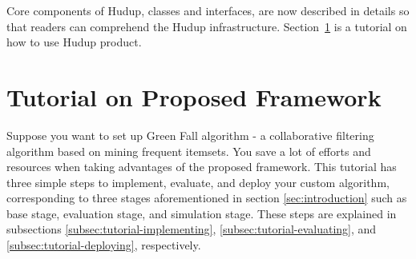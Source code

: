 \documentclass[a4paper]{llncs}
\begin{document}
Core components of Hudup, classes and interfaces, are now described in details so that readers can comprehend the Hudup infrastructure. Section~\ref{sec:tutorial} is a tutorial on how to use Hudup product.

\section{Tutorial on Proposed Framework}
\label{sec:tutorial}
Suppose you want to set up Green Fall algorithm - a collaborative filtering algorithm based on mining frequent itemsets. You save a lot of efforts and resources when taking advantages of the proposed framework. This tutorial has three simple steps to implement, evaluate, and deploy your custom algorithm, corresponding to three stages aforementioned in section \ref{sec:introduction} such as base stage, evaluation stage, and simulation stage. These steps are explained in subsections \ref{subsec:tutorial-implementing}, \ref{subsec:tutorial-evaluating}, and \ref{subsec:tutorial-deploying}, respectively. 
\end{document}
